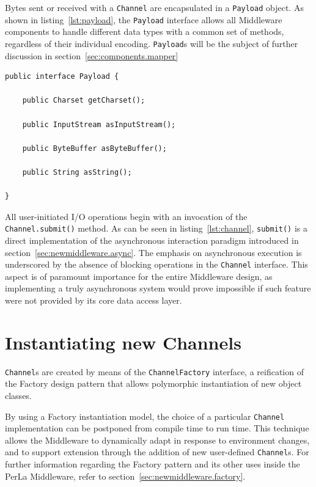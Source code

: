 Bytes sent or received with a \texttt{Channel} are encapsulated in a
\texttt{Payload} object. As shown in listing~\ref{lst:payload}, the
\texttt{Payload} interface allows all Middleware components to handle different
data types with a common set of methods, regardless of their individual
encoding.  \texttt{Payload}s will be the subject of further discussion in
section~\ref{sec:components.mapper}

\lstset{language=Java}
\begin{lstlisting}[float,caption=The Payload interface,label={lst:payload}]
public interface Payload {

	public Charset getCharset();

	public InputStream asInputStream();

	public ByteBuffer asByteBuffer();

	public String asString();

}
\end{lstlisting}

All user-initiated I/O operations begin with an invocation of the
\texttt{Channel.submit()} method. As can be seen in listing~\ref{lst:channel},
\texttt{submit()} is a direct implementation of the asynchronous interaction
paradigm introduced in section~\ref{sec:newmiddleware.async}. The emphasis on
asynchronous execution is underscored by the absence of blocking operations in
the \texttt{Channel} interface. This aspect is of paramount importance for the
entire Middleware design, as implementing a truly asynchronous system would
prove impossible if such feature were not provided by its core data access
layer.


\section{Instantiating new Channels}

\texttt{Channel}s are created by means of the \texttt{ChannelFactory}
interface, a reification of the Factory design pattern that allows polymorphic
instantiation of new object classes.

By using a Factory instantiation model, the choice of a particular
\texttt{Channel} implementation can be postponed from compile time to run time.
This technique allows the Middleware to dynamically adapt in response to
environment changes, and to support extension through the addition of new
user-defined \texttt{Channel}s. For further information regarding the Factory
pattern and its other uses inside the PerLa Middleware, refer to
section~\ref{sec:newmiddleware.factory}.

